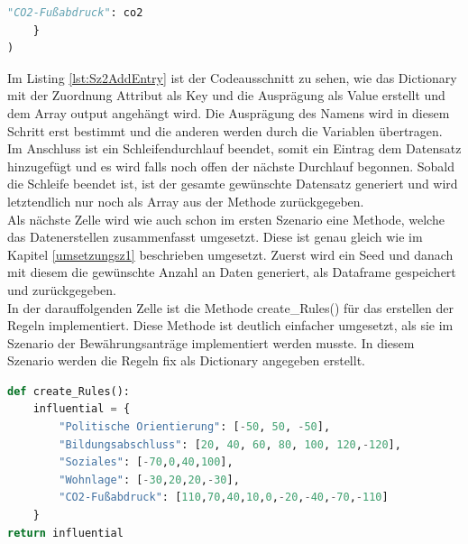 \begin{onehalfspace}
\begin{lstlisting}[language=Python,label={lst:Sz2AddEntry},caption=Codeausschnitt zum Hinzufügen eines Dateneintrags zum gesamt Datenset]
        "CO2-Fußabdruck": co2
    }  
)
\end{lstlisting}
Im Listing \ref{lst:Sz2AddEntry} ist der Codeausschnitt zu sehen, wie das Dictionary mit der Zuordnung Attribut als Key und die Ausprägung als Value erstellt und dem Array \glqq{}output\grqq{} angehängt wird. Die Ausprägung des Namens wird in diesem Schritt erst bestimmt und die anderen werden durch die Variablen übertragen.
Im Anschluss ist ein Schleifendurchlauf beendet, somit ein Eintrag dem Datensatz hinzugefügt und es wird falls noch offen der nächste Durchlauf begonnen. Sobald die Schleife beendet ist, ist der gesamte gewünschte Datensatz generiert und wird letztendlich nur noch als Array aus der Methode zurückgegeben. \\
Als nächste Zelle wird wie auch schon im ersten Szenario eine Methode, welche das Datenerstellen zusammenfasst umgesetzt. Diese ist genau gleich wie im Kapitel \ref{umsetzungsz1} beschrieben umgesetzt. Zuerst wird ein Seed und danach mit diesem die gewünschte Anzahl an Daten generiert, als Dataframe gespeichert und zurückgegeben.\\ 
In der darauffolgenden Zelle ist die Methode \glqq{}create\_Rules()\grqq{} für das erstellen der Regeln implementiert. Diese Methode ist deutlich einfacher umgesetzt, als sie im Szenario der Bewährungsanträge implementiert werden musste. In diesem Szenario werden die Regeln fix als Dictionary angegeben erstellt.
\begin{lstlisting}[language=Python,label={lst:Sz2Regeln},caption=Codeausschnitt zum Erstellen des Regel Dictionary]
def create_Rules():
    influential = {
        "Politische Orientierung": [-50, 50, -50],
        "Bildungsabschluss": [20, 40, 60, 80, 100, 120,-120],
        "Soziales": [-70,0,40,100],
        "Wohnlage": [-30,20,20,-30],
        "CO2-Fußabdruck": [110,70,40,10,0,-20,-40,-70,-110]
    }
return influential
\end{lstlisting}

\end{onehalfspace}
